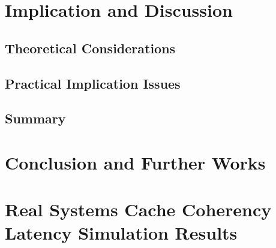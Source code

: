 \documentclass[medieteknikk]{gucmasterthesis}
\begin{document}
\chapter{Implication and Discussion}
	\section{Theoretical Considerations}
	\section{Practical Implication Issues}
	\section{Summary}
\chapter{Conclusion and Further Works}


\appendix

\chapter{Real Systems Cache Coherency Latency Simulation Results}
\end{document}
